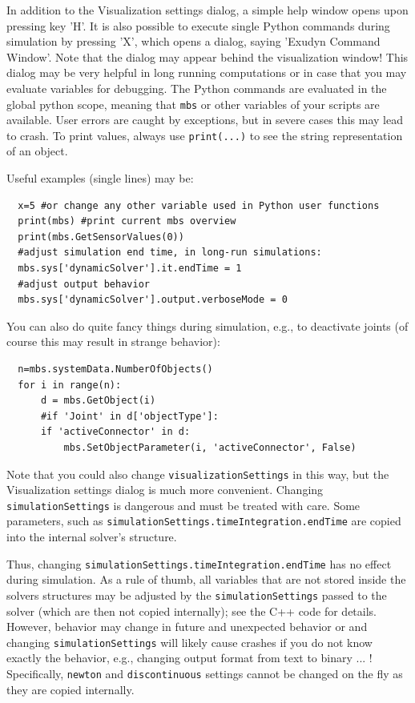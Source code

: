%
In addition to the Visualization settings dialog, a simple help window opens upon pressing key 'H'. 
It is also possible to execute single Python commands during simulation by pressing 'X', which opens a dialog, saying 'Exudyn Command Window'. 
Note that the dialog may appear behind the visualization window!
This dialog may be very helpful in long running computations or in case that you may evaluate variables for debugging.
The Python commands are evaluated in the global python scope, meaning that \texttt{mbs} or other variables of your scripts are available.
User errors are caught by exceptions, but in severe cases this may lead to crash.
To print values, always use \texttt{print(...)} to see the string representation of an object.

\noindent Useful examples (single lines) may be: 
\pythonstyle\begin{lstlisting}
  x=5 #or change any other variable used in Python user functions
  print(mbs) #print current mbs overview
  print(mbs.GetSensorValues(0))
  #adjust simulation end time, in long-run simulations:
  mbs.sys['dynamicSolver'].it.endTime = 1 
  #adjust output behavior
  mbs.sys['dynamicSolver'].output.verboseMode = 0
\end{lstlisting}

\noindent You can also do quite fancy things during simulation, e.g., to deactivate joints (of course this may result in strange behavior):
\pythonstyle\begin{lstlisting}
  n=mbs.systemData.NumberOfObjects()
  for i in range(n):
      d = mbs.GetObject(i)
      #if 'Joint' in d['objectType']:
      if 'activeConnector' in d:
          mbs.SetObjectParameter(i, 'activeConnector', False)
\end{lstlisting}


Note that you could also change \texttt{visualizationSettings} in this way, but the Visualization settings dialog is much more convenient.
Changing \texttt{simulationSettings} is dangerous and must be treated with care.
Some parameters, such as \texttt{simulationSettings.timeIntegration.endTime} are copied into the internal solver's  structure.

Thus, changing \texttt{simulationSettings.timeIntegration.endTime} has no effect during simulation. 
As a rule of thumb, all variables that are not stored inside the solvers structures may be adjusted by the \texttt{simulationSettings} passed to the solver (which are then not copied internally); see the C++ code for details. However, behavior may change in future and unexpected behavior or and changing \texttt{simulationSettings} will likely cause crashes if you do not know exactly the behavior, e.g., changing output format from text to binary ... !
Specifically, \texttt{newton} and \texttt{discontinuous} settings cannot be changed on the fly as they are copied internally.

